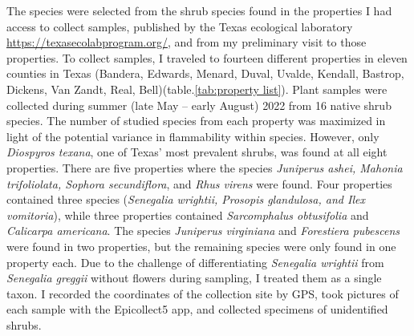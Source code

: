 \documentclass[12pt]{report}
\begin{document}
The species were selected from the shrub species found in the properties I had access to collect samples, published by the Texas ecological laboratory  \url{https://texasecolabprogram.org/}, and from my preliminary visit to those properties. To collect samples, I traveled to fourteen different properties in eleven counties in Texas (Bandera, Edwards, Menard, Duval, Uvalde, Kendall, Bastrop, Dickens, Van Zandt, Real, Bell)(table.\ref{tab:property list}).   %
Plant samples were collected during summer (late May -- early August) 2022 from 16 native shrub species. The number of studied species from each property was maximized in light of the potential variance in flammability within species. However, only \emph{Diospyros texana}, one of Texas' most prevalent shrubs, was found at all eight properties. There are five properties where the species \emph{Juniperus ashei, Mahonia trifoliolata, Sophora secundiflora}, and \emph{Rhus virens} were found. Four properties contained three species (\emph{Senegalia wrightii, Prosopis glandulosa, and Ilex vomitoria}), while three properties contained \emph{Sarcomphalus obtusifolia} \citep{hauenschild2016phylogenetic} and \emph{Calicarpa americana}. The species \emph{Juniperus virginiana} and \emph{Forestiera pubescens} were found in two properties, but the remaining species were only found in one property each. %
 Due to the challenge of differentiating \emph{Senegalia wrightii} from \emph{Senegalia greggii} without flowers during sampling, I treated them as a single taxon. I recorded the coordinates of the collection site by GPS, took pictures of each sample with the Epicollect5 app, and collected specimens of unidentified shrubs.
\end{document}
